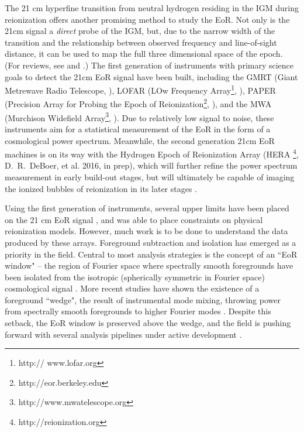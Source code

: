 \documentclass[iop]{emulateapj}
\begin{document}
The 21 cm hyperfine transition from neutral hydrogen residing in the IGM during reionization 
offers another promising method to study the EoR. Not only is the 21cm signal a 
\emph{direct} probe of the IGM, but, due to the narrow width of the transition and the 
relationship between observed frequency and line-of-sight distance, it can be used to map 
the full three dimensional space of the epoch. (For reviews, see \citealt{Furlanetto:2006} 
and \citealt{Morales:2010}.) The first generation of instruments with primary science goals 
to detect the 21cm EoR signal have been built, including the GMRT (Giant Metrewave 
Radio Telescope, \citealt{Paciga:2013}), LOFAR (LOw Frequency Array\footnote{http://
www.lofar.org}, \citealt{Yatawatta:2013}), PAPER (Precision Array for Probing the Epoch of 
Reionization\footnote{http://eor.berkeley.edu}, \citealt{Parsons:2010}), and the MWA 
(Murchison Widefield Array\footnote{http://www.mwatelescope.org}, \citealt{Tingay:2013}). 
Due to relatively low signal to noise, these instruments aim for a statistical measurement of 
the EoR in the form of a cosmological power spectrum. Meanwhile, the second generation 
21cm EoR machines is on its way with the Hydrogen Epoch of Reionization Array (HERA
\footnote{http://reionization.org}, D.~R.~DeBoer, et al. 2016, in prep), which will further 
refine the power spectrum measurement in early build-out stages, but will ultimately be 
capable of imaging the ionized bubbles of reionization in its later stages 
\citep{Beardsley:2015,Malloy:2013}.

Using the first generation of instruments, several upper limits have been placed on the 21 
cm EoR signal \citep{Ali:2015, Dillon:2014, Parsons:2014, Jacobs:2015, Paciga:2013}, and 
\citealt{Pober:2015} was able to place constraints on physical reionization models. 
However, much work is to be done to understand the data produced by these arrays. 
Foreground subtraction and isolation has emerged as a priority in the field. Central to most 
analysis strategies is the concept of an ``EoR window" -- the region of Fourier space where 
spectrally smooth foregrounds have been isolated from the isotropic (spherically symmetric 
in Fourier space) cosmological signal \citep{Morales:2006, Bowman:2009}. More recent 
studies have shown the existence of a foreground ``wedge", the result of instrumental mode 
mixing, throwing power from spectrally smooth foregrounds to higher Fourier modes 
\citep{Thyagarajan:2015b, Thyagarajan:2015, Trott:2014, Liu:2014a, Liu:2014b, 
Hazelton:2013, Pober:2013, Vedantham:2012, Morales:2012, Datta:2010}. Despite this 
setback, the EoR window is preserved above the wedge, and the field is pushing forward with 
several analysis pipelines under active development \citep[e.g. B.~J.~Hazelton et al. 2016, in 
prep; D.~A.~Mitchell et al. 2016, in prep; D.~C.~Jacobs et al. 2016, in review; ][]{Trott:2016, 
Dillon:2013, Trott:2012}.
\end{document}
